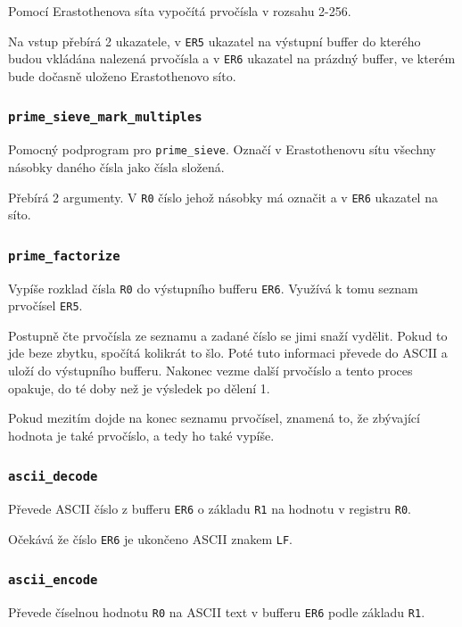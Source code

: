 \documentclass[12pt]{article}
\newcommand{\code}[1]{\mbox{\texttt{#1}}}
\begin{document}
Pomocí Erastothenova síta vypočítá prvočísla v rozsahu 2-256.

Na vstup přebírá 2 ukazatele, v \code{ER5} ukazatel na výstupní buffer do
kterého budou vkládána nalezená prvočísla a v \code{ER6} ukazatel na prázdný
buffer, ve kterém bude dočasně uloženo Erastothenovo síto.

\subsubsection{\code{prime\_sieve\_mark\_multiples}}

Pomocný podprogram pro \code{prime\_sieve}. Označí v Erastothenovu sítu všechny násobky daného
čísla jako čísla složená.

Přebírá 2 argumenty. V \code{R0} číslo jehož násobky má označit a v \code{ER6} ukazatel na síto.

\subsubsection{\code{prime\_factorize}}

Vypíše rozklad čísla \code{R0} do výstupního bufferu \code{ER6}. Využívá k tomu seznam prvočísel
\code{ER5}.

Postupně čte prvočísla ze seznamu a zadané číslo se jimi snaží vydělit. Pokud
to jde beze zbytku, spočítá kolikrát to šlo. Poté tuto informaci převede do
ASCII a uloží do výstupního bufferu. Nakonec vezme další prvočíslo a tento
proces opakuje, do té doby než je výsledek po dělení 1.

Pokud mezitím dojde na konec seznamu prvočísel, znamená to, že zbývající
hodnota je také prvočíslo, a tedy ho také vypíše.

\subsubsection{\code{ascii\_decode}}

Převede ASCII číslo z bufferu \code{ER6} o základu \code{R1} na hodnotu v
registru \code{R0}.

Očekává že číslo \code{ER6} je ukončeno ASCII znakem \code{LF}.

\subsubsection{\code{ascii\_encode}}

Převede číselnou hodnotu \code{R0} na ASCII text v bufferu \code{ER6} podle
základu \code{R1}.
\end{document}
